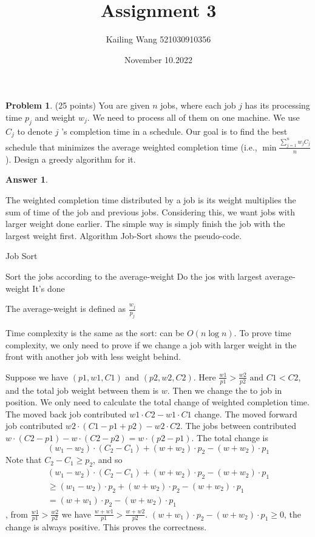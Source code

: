 \documentclass{article}
\theoremstyle{definition}
\newtheorem{prob}{Problem}
\newtheorem{ans}{Answer}
\begin{document}
	\title{Assignment 3}
	\author{Kailing Wang 521030910356}
	\date{November 10.2022}
	\maketitle
	\begin{prob}
		(25 points) You are given $n$ jobs, where each job $j$ has its processing time $p_{j}$ and weight $w_{j}$. We need to process all of them on one machine. We use $C_{j}$ to denote $j$ 's completion time in a schedule. Our goal is to find the best schedule that minimizes the average weighted completion time (i.e., $\min \frac{\sum_{j=1}^{n} w_{j} C_{j}}{n}$ ). Design a greedy algorithm for it.
	\end{prob}

	\begin{ans}
		~
		
		The weighted completion time distributed by a job is its weight multiplies the sum of time of the job and previous jobs. Considering this, we want jobs with larger weight done earlier. The simple way is simply finish the job with the largest weight first. Algorithm Job-Sort shows the pseudo-code. 
		
		\begin{algorithm}
			\caption{Job Sort}
			\BlankLine
			Sort the jobs according to the average-weight\;
			{
				Do the jos with largest average-weight\;
			}
			It's done\;
		\end{algorithm}
	
		The average-weight is defined as $\frac{w_j}{p_j}$
			
		Time complexity is the same as the sort: can be $O(n\log n)$. To prove time complexity, we only need to prove if we change a job with larger weight in the front with another job with less weight behind. 
		
		Suppose we have $(p1,w1,C1)$ and $(p2,w2,C2)$. Here $\frac{w1}{p1}>\frac{w2}{p2} \text{ and } C1<C2$, and the total job weight between them is $w$. Then we change the to job in position. We only need to calculate the total change of weighted completion time. The moved back job contributed $w1\cdot C2-w1\cdot C1$ change. The moved forward job contributed $w2\cdot (C1-p1+p2)-w2\cdot C2$. The jobs between contributed $w\cdot (C2-p1)-w\cdot (C2-p2)=w\cdot (p2-p1)$. The total change is 
		$$(w_1-w_2)\cdot (C_2-C_1)+(w+w_2)\cdot p_2-(w+w_2)\cdot p_1$$
		Note that $C_2-C_1\geq p_2$, and so 
		$$
		\begin{aligned}
			(w_1-w_2)\cdot (C_2-C_1)+(w+w_2)\cdot p_2-(w+w_2)\cdot p_1 \\ \geq (w_1-w_2)\cdot p_2+(w+w_2)\cdot p_2-(w+w_2)\cdot p_1 \\ =(w+w_1)\cdot p_2-(w+w_2)\cdot p_1
		\end{aligned}$$
		, from $\frac{w1}{p1}>\frac{w2}{p2}$ we have $\frac{w+w1}{p1}>\frac{w+w2}{p2}$. $(w+w_1)\cdot p_2-(w+w_2)\cdot p_1\geq 0$, the change is always positive. This proves the correctness.
		\end{ans}
\end{document}
